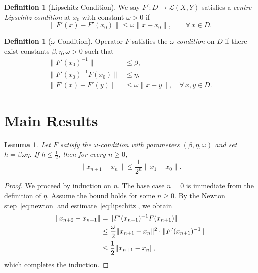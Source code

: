 \documentclass[12pt, a4paper]{article}
\theoremstyle{plain}       %
\newtheorem{lemma}[theorem]{Lemma}          %
\theoremstyle{definition}  %
\newtheorem{definition}[theorem]{Definition}
\theoremstyle{remark}      %
\begin{document}
\begin{definition}[Lipschitz Condition]
    \label{def:lipschitz}
    We say $F' \colon D \to \mathcal{L}(X, Y)$ satisfies a
    \emph{centre Lipschitz condition} at $x_0$ with constant $\omega > 0$ if
    \begin{equation}
        \lVert F'(x) - F'(x_0) \rVert \leq \omega \lVert x - x_0 \rVert,
        \qquad \forall\, x \in D.
        \label{eq:lipschitz}
    \end{equation}
\end{definition}

\begin{definition}[$\omega$-Condition]
    Operator $F$ satisfies the \emph{$\omega$-condition} on $D$ if there
    exist constants $\beta, \eta, \omega > 0$ such that
    \begin{align}
        \lVert F'(x_0)^{-1} \rVert           &\leq \beta,
            \label{eq:omega_a} \\
        \lVert F'(x_0)^{-1} F(x_0) \rVert    &\leq \eta,
            \label{eq:omega_b} \\
        \lVert F'(x) - F'(y) \rVert           &\leq \omega \lVert x - y \rVert,
            \quad \forall\, x, y \in D.
            \label{eq:omega_c}
    \end{align}
\end{definition}

\section{Main Results}
\label{sec:main}

\begin{lemma}
    \label{lem:bound}
    Let $F$ satisfy the $\omega$-condition with parameters
    $(\beta, \eta, \omega)$ and set $h = \beta \omega \eta$.  If $h \leq
    \tfrac{1}{2}$, then for every $n \geq 0$,
    \begin{equation}
        \lVert x_{n+1} - x_n \rVert
            \leq \frac{1}{2^{n}} \lVert x_1 - x_0 \rVert.
        \label{eq:bound}
    \end{equation}
\end{lemma}

\begin{proof}
    We proceed by induction on $n$.  The base case $n = 0$ is immediate from
    the definition of $\eta$.  Assume the bound holds for some $n \geq 0$.
    By the Newton step~\eqref{eq:newton} and
    estimate~\eqref{eq:lipschitz}, we obtain
    \begin{align}
        \lVert x_{n+2} - x_{n+1} \rVert
            &= \lVert F'(x_{n+1})^{-1} F(x_{n+1}) \rVert \notag \\
            &\leq \frac{\omega}{2}
                  \lVert x_{n+1} - x_n \rVert^{2}
                  \cdot \lVert F'(x_{n+1})^{-1} \rVert \notag \\
            &\leq \frac{1}{2} \lVert x_{n+1} - x_n \rVert,
    \end{align}
    which completes the induction.
\end{proof}
\end{document}
